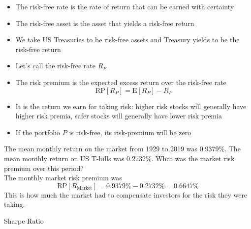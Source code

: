 \documentclass{beamer}
\begin{document}
\begin{frame}{}
	\begin{itemize}
		\item The risk-free rate is the rate of return that can be earned with certainty
		\item The risk-free asset is the asset that yields a risk-free return
		\item We take US Treasuries to be risk-free assets and Treasury yields to be the risk-free return
		\item Let's call the risk-free rate $R_{F}$ 
	\end{itemize}
\end{frame}

\begin{frame}{}
	\begin{itemize}
		\item The risk premium is the expected excess return over the risk-free rate
		\begin{equation*}
			\text{RP}[R_{P}]=\text{E}[R_{P}]-R_{F}
		\end{equation*}
		\item It is the return we earn for taking risk: higher risk stocks will generally have higher risk premia, safer stocks will generally have lower risk premia
		\item If the portfolio $P$ is risk-free, its risk-premium will be zero
	\end{itemize}
\end{frame}

\begin{frame}{}
	The mean monthly return on the market from 1929 to 2019 was 0.9379\%. The mean monthly return on US T-bills was 0.2732\%. What was the market risk premium over this period?\\
	\pause
	{\color{blue}
		The monthly market risk premium was
		\begin{equation*}
			\text{RP}[R_{\text{Market}}]=0.9379\%-0.2732\%=0.6647\%
		\end{equation*}
		This is how much the market had to compensate investors for the risk they were taking.
	}
\end{frame}

\begin{frame}
\begin{center}
\Huge Sharpe Ratio
\end{center}
\end{frame}
\end{document}
